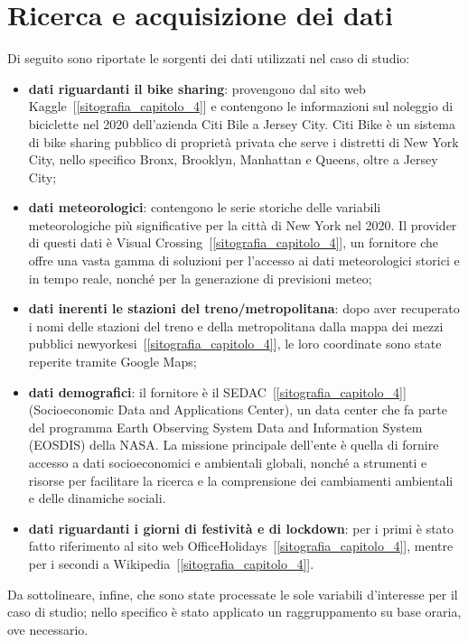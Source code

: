 \section[Ricerca e acquisizione dati]{Ricerca e acquisizione dei dati}
Di seguito sono riportate le sorgenti dei dati utilizzati nel caso di studio:
\begin{itemize}
	\item \textbf{dati riguardanti il bike sharing}: provengono dal sito web Kaggle~[\ref{sitografia_capitolo_4}] e contengono le informazioni sul noleggio di biciclette nel \num{2020} dell'azienda Citi Bile a Jersey City. Citi Bike è un sistema di bike sharing pubblico di proprietà privata che serve i distretti di New York City, nello specifico Bronx, Brooklyn, Manhattan e Queens, oltre a Jersey City;
	\item \textbf{dati meteorologici}: contengono le serie storiche delle variabili meteorologiche più significative per la città di New York nel \num{2020}. Il provider di questi dati è Visual Crossing~[\ref{sitografia_capitolo_4}], un fornitore che offre una vasta gamma di soluzioni per l'accesso ai dati meteorologici storici e in tempo reale, nonché per la generazione di previsioni meteo;
	\item \textbf{dati inerenti le stazioni del treno/metropolitana}: dopo aver recuperato i nomi delle stazioni del treno e della metropolitana dalla mappa dei mezzi pubblici newyorkesi~[\ref{sitografia_capitolo_4}], le loro coordinate sono state reperite tramite Google Maps;
	\item \textbf{dati demografici}: il fornitore è il SEDAC~[\ref{sitografia_capitolo_4}] (Socioeconomic Data and Applications Center), un data center che fa parte del programma Earth Observing System Data and Information System (EOSDIS) della NASA. La missione principale dell'ente è quella di fornire accesso a dati socioeconomici e ambientali globali, nonché a strumenti e risorse per facilitare la ricerca e la comprensione dei cambiamenti ambientali e delle dinamiche sociali.
	\item \textbf{dati riguardanti i giorni di festività e di lockdown}: per i primi è stato fatto riferimento al sito web OfficeHolidays~[\ref{sitografia_capitolo_4}], mentre per i secondi a Wikipedia~[\ref{sitografia_capitolo_4}].
\end{itemize}
Da sottolineare, infine, che sono state processate le sole variabili d'interesse per il caso di studio; nello specifico è stato applicato un raggruppamento su base oraria, ove necessario.

